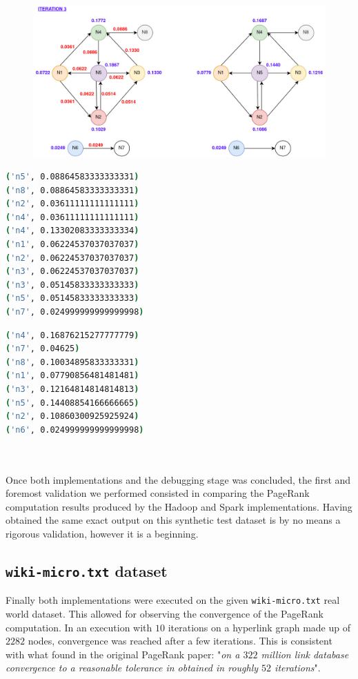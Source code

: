 \documentclass[11pt,a4paper]{article}
\begin{document}
\begin{figure}[H]
    \centering
    \includegraphics[scale=0.26]{imgs/iteration-3.jpg}
\end{figure}
\begin{minipage}{.45\textwidth}
\begin{lstlisting}[language=bash,title={Contributions}]
('n5', 0.08864583333333331)
('n8', 0.08864583333333331)
('n2', 0.03611111111111111)
('n4', 0.03611111111111111)
('n4', 0.13302083333333334)
('n1', 0.06224537037037037)
('n2', 0.06224537037037037)
('n3', 0.06224537037037037)
('n3', 0.05145833333333333)
('n5', 0.05145833333333333)
('n7', 0.024999999999999998)
\end{lstlisting}
\end{minipage}\hfill
\begin{minipage}{.45\textwidth}
\begin{lstlisting}[language=bash,title={New PageRanks}]
('n4', 0.16876215277777779)
('n7', 0.04625)
('n8', 0.10034895833333331)
('n1', 0.07790856481481481)
('n3', 0.12164814814814813)
('n5', 0.14408854166666665)
('n2', 0.10860300925925924)
('n6', 0.024999999999999998)
\end{lstlisting}
\end{minipage}\\
\\
Once both implementations and the debugging stage was concluded, the first and foremost validation we performed consisted in comparing the PageRank computation results produced by the Hadoop and Spark implementations. Having obtained the same exact output on this synthetic test dataset is by no means a rigorous validation, however it is a beginning.
\subsection{\texttt{wiki-micro.txt} dataset}
Finally both implementations were executed on the given \texttt{wiki-micro.txt} real world dataset. This allowed for observing the convergence of the PageRank computation. In an execution with $10$ iterations on a hyperlink graph made up of $2282$ nodes, convergence was reached after a few iterations. This is consistent with what found in the original PageRank paper: "\textit{on a $322$ million link database convergence to a reasonable tolerance in obtained in roughly $52$ iterations}".
\end{document}
